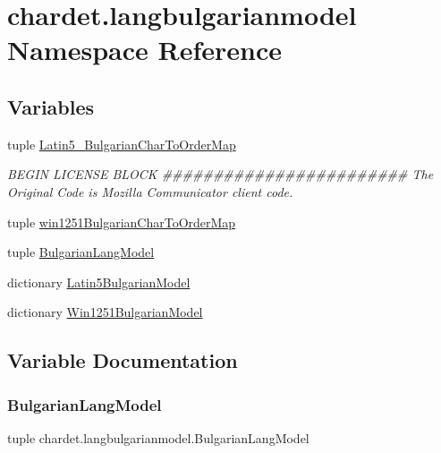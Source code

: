 \hypertarget{namespacechardet_1_1langbulgarianmodel}{}\section{chardet.\+langbulgarianmodel Namespace Reference}
\label{namespacechardet_1_1langbulgarianmodel}
\subsection*{Variables}
\begin{DoxyCompactItemize}
\item 
tuple \hyperlink{namespacechardet_1_1langbulgarianmodel_a3dbf1687d8644825f08a8e4ffd530e46}{Latin5\+\_\+\+Bulgarian\+Char\+To\+Order\+Map}
\begin{DoxyCompactList}\small\item\em B\+E\+G\+IN L\+I\+C\+E\+N\+SE B\+L\+O\+CK \#\#\#\#\#\#\#\#\#\#\#\#\#\#\#\#\#\#\#\#\#\#\#\# The Original Code is Mozilla Communicator client code. \end{DoxyCompactList}\item 
tuple \hyperlink{namespacechardet_1_1langbulgarianmodel_a7a813eab0e687a1a6aa373d21806a16c}{win1251\+Bulgarian\+Char\+To\+Order\+Map}
\item 
tuple \hyperlink{namespacechardet_1_1langbulgarianmodel_a0c40b0ab8494bb229797ba56e403656e}{Bulgarian\+Lang\+Model}
\item 
dictionary \hyperlink{namespacechardet_1_1langbulgarianmodel_a6eadecfa2ffa667048b345f7c821539f}{Latin5\+Bulgarian\+Model}
\item 
dictionary \hyperlink{namespacechardet_1_1langbulgarianmodel_a7901e504e5bb13f0fea9c63eac11dc03}{Win1251\+Bulgarian\+Model}
\end{DoxyCompactItemize}


\subsection{Variable Documentation}
\mbox{\label{namespacechardet_1_1langbulgarianmodel_a0c40b0ab8494bb229797ba56e403656e}} 
\subsubsection{\texorpdfstring{Bulgarian\+Lang\+Model}{BulgarianLangModel}}
{\footnotesize\ttfamily tuple chardet.\+langbulgarianmodel.\+Bulgarian\+Lang\+Model}

